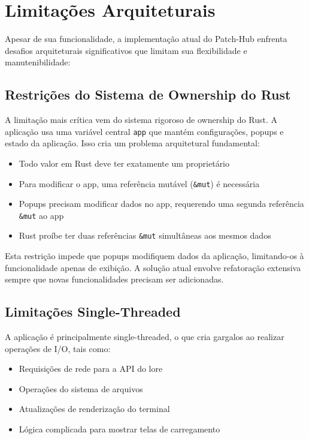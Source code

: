 \section{Limitações Arquiteturais}

Apesar de sua funcionalidade, a implementação atual do Patch-Hub enfrenta desafios arquiteturais significativos que limitam sua flexibilidade e manutenibilidade:

\subsection{Restrições do Sistema de Ownership do Rust}

A limitação mais crítica vem do sistema rigoroso de ownership do Rust. A aplicação usa uma variável central \texttt{app} que mantém configurações, popups e estado da aplicação. Isso cria um problema arquitetural fundamental:

\begin{itemize}
    \item Todo valor em Rust deve ter exatamente um proprietário
    \item Para modificar o app, uma referência mutável (\texttt{\&mut}) é necessária
    \item Popups precisam modificar dados no app, requerendo uma segunda referência \texttt{\&mut} ao app
    \item Rust proíbe ter duas referências \texttt{\&mut} simultâneas aos mesmos dados
\end{itemize}

Esta restrição impede que popups modifiquem dados da aplicação, limitando-os à funcionalidade apenas de exibição. A solução atual envolve refatoração extensiva sempre que novas funcionalidades precisam ser adicionadas.

\subsection{Limitações Single-Threaded}

A aplicação é principalmente single-threaded, o que cria gargalos ao realizar operações de I/O, tais como:

\begin{itemize}
    \item Requisições de rede para a API do lore
    \item Operações do sistema de arquivos
    \item Atualizações de renderização do terminal
    \item Lógica complicada para mostrar telas de carregamento
\end{itemize}

